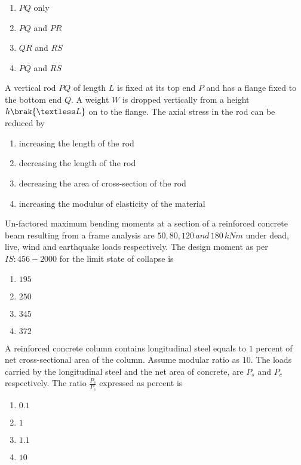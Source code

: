     \begin{enumerate}
        \item $PQ$ only
        \item $PQ$ and $PR$
        \item $QR$ and $RS$
        \item $PQ$ and $RS$
    \end{enumerate}
    \item A vertical rod $PQ$ of length $L$ is fixed at its top end $P$ and has a flange fixed to the bottom end $Q$. A weight $W$ is dropped vertically from a height $h\brak{\textless L}$ on to the flange. The axial stress in the rod can be reduced by
    \begin{enumerate}
        \item increasing the length of the rod 
        \item decreasing the length of the rod
        \item decreasing the area of cross-section of the rod
        \item increasing the modulus of elasticity of the material
    \end{enumerate}
    \item Un-factored maximum bending moments at a section of a reinforced concrete beam resulting from a frame analysis are $50,80,120\,and\,180\,kNm$ under dead, live, wind and earthquake loads respectively. The design moment  as per $IS\colon456-2000$ for the limit state of collapse is
    \begin{enumerate}
        \item $195$
        \item $250$
        \item $345$
        \item $372$
    \end{enumerate}
    \item A reinforced concrete column contains longitudinal steel equals to $1$ percent of net cross-sectional area of the column. Assume modular ratio as $10$. The loads carried  by the longitudinal steel and the net area of concrete, are $P_s$ and $P_c$ respectively. The ratio $\frac{P_s}{P_c}$ expressed as percent is
    \begin{enumerate}
        \item $0.1$
        \item $1$
        \item $1.1$
        \item $10$
    \end{enumerate}
